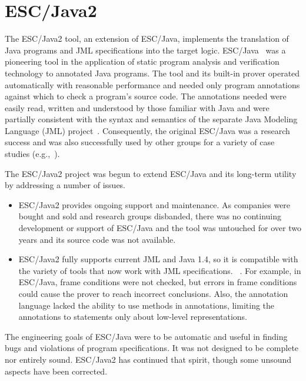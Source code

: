 \documentclass{sig-alternate}
\begin{document}
\section{ESC/Java2}

The ESC/Java2 tool, an extension of ESC/Java,
 implements the translation of Java programs and JML specifications into
the target logic.   
ESC/Java~\cite{Flanagan-etal02}
 was a pioneering tool in the
application of static program analysis and verification technology to
annotated Java programs.  The tool and its built-in
prover operated automatically with reasonable performance and needed
only program annotations against which to check a program's source
code.  The annotations needed were easily read, written and understood
by those familiar with Java and were partially consistent with the syntax
and semantics of the separate Java Modeling Language (JML)
project~\cite{jmlpapers,Leavens-etal00}.  Consequently, the original
ESC/Java was a research success
and was also successfully used by other groups for a variety of case
studies (e.g.,~\cite{Hub03,HOP04}).

The ESC/Java2 project \cite{CokKiniry04} was begun to extend ESC/Java
and its long-term utility by addressing a number of issues.
\begin{itemize}
\setlength{\itemsep}{0in}
\setlength{\parsep}{0in}
\item ESC/Java2 provides ongoing support and maintenance.
As companies were bought and sold and research groups
disbanded, there was no continuing development or support of 
ESC/Java and the tool was untouched for over two years and its
source code was not available. 
\item ESC/Java2 fully supports current JML and Java 1.4, so it is
compatible with the variety of tools that now work with JML specifications.
~\cite{jmlpapers,Burdy-etal03,Leavens-etal00,NimmerErnst01,Bogor03,BergJ01}.
For
example, in ESC/Java, frame conditions were not checked, but errors in frame
conditions could cause the prover to reach incorrect conclusions.
Also, the annotation language lacked the ability to use methods in
annotations, limiting the annotations to statements only about
low-level representations.
\end{itemize}

The engineering goals of ESC/Java were to be automatic and useful in finding bugs
and violations of program specifications.  It was not designed to be complete nor
entirely sound.  ESC/Java2 has continued that spirit, though some unsound aspects have
been corrected.
\end{document}
